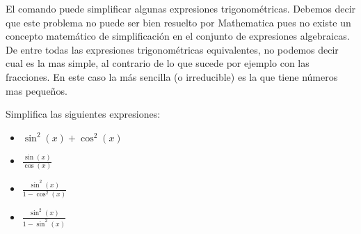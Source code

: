 \documentclass[a4paper,10pt, draft]{article}
\newcommand{\com}[1]{\textbf{\color{blue}{#1}}}
\newenvironment{ejer}{\begin{tcolorbox}[center title, title=Ejercicios,
fonttitle=\sffamily\bfseries,colback=blue!5,colframe=orange]}{\end{tcolorbox}}
\begin{document}
El comando \com{Simplify}  puede simplificar algunas expresiones trigonométricas. Debemos decir  que este problema no puede ser bien resuelto por Mathematica pues no existe un concepto matemático de simplificación en el conjunto de expresiones algebraicas. De entre todas las expresiones trigonométricas equivalentes, no podemos decir cual es la mas simple, al contrario de lo que sucede por ejemplo con las fracciones. En este caso la más sencilla (o irreducible) es la que tiene números mas pequeños.

\begin{ejer}

Simplifica las siguientes expresiones:

\begin{itemize}

\item $\sin^2(x)+\cos^2(x)\qquad $  

\item $\displaystyle\frac{\sin(x)}{\cos(x)}\qquad $ 


\item $\displaystyle \frac{\sin^2(x)}{1-\cos^2(x)}\qquad $

\item $\displaystyle \frac{\sin^2(x)}{1-\sin^2(x)}\qquad $

\end{itemize}




\end{ejer} 
\end{document}

